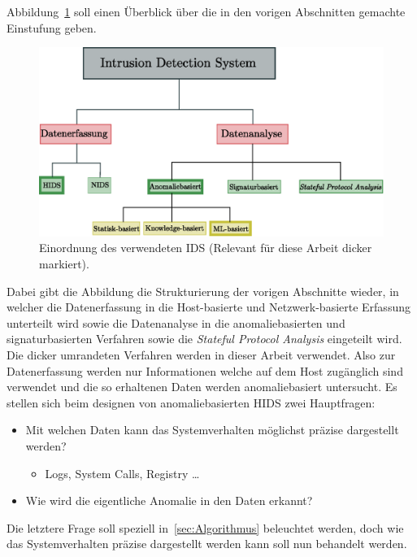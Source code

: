         Abbildung~\ref{fig:IDSOverview} soll einen Überblick über die in den vorigen Abschnitten gemachte Einstufung geben.
        \begin{figure}[ht]
            \centering
            \includegraphics[width=1\textwidth]{images/Illustrationen/IDS/IDSOverview}
            \caption{Einordnung des verwendeten IDS (Relevant für diese Arbeit dicker markiert).}\label{fig:IDSOverview}
        \end{figure}
        Dabei gibt die Abbildung die Strukturierung der vorigen Abschnitte wieder,
        in welcher die Datenerfassung in die Host-basierte und Netzwerk-basierte Erfassung unterteilt wird sowie die Datenanalyse
        in die anomaliebasierten und signaturbasierten Verfahren sowie die \textit{Stateful Protocol Analysis} eingeteilt wird.
        Die dicker umrandeten Verfahren werden in dieser Arbeit verwendet.
        Also zur Datenerfassung werden nur Informationen welche auf dem Host zugänglich sind verwendet 
        und die so erhaltenen Daten werden anomaliebasiert untersucht.
        Es stellen sich beim designen von anomaliebasierten \ac{HIDS} zwei Hauptfragen:
        \begin{itemize}
            \item Mit welchen Daten kann das Systemverhalten möglichst präzise dargestellt werden?
                \begin{itemize}
                    \item Logs, System Calls, Registry \dots~\cite{HIDSSURVEY2019bridges}
                \end{itemize}
            \item Wie wird die eigentliche Anomalie in den Daten erkannt?
        \end{itemize}
        Die letztere Frage soll speziell in~\autoref{sec:Algorithmus} beleuchtet werden, doch wie das Systemverhalten präzise dargestellt werden kann soll nun behandelt werden.

